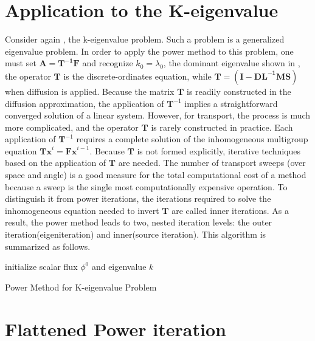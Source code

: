 \section{Application to the K-eigenvalue}

Consider again , the k-eigenvalue problem.
Such a problem is a generalized eigenvalue problem.
In order to apply the power method to this problem, one must set $\mathbf{A=T^{-1}F}$ and recognize $k_0= \lambda_0$, the dominant eigenvalue shown in , the operator $\mathbf{T}$ is the discrete-ordinates equation, while $\mathbf{T} = (\mathbf{I  - DL^{-1}MS})$ when diffusion is applied.
Because the matrix $\mathbf{T}$ is readily constructed in the diffusion approximation, the application of $\mathbf{T}^{-1}$ implies a straightforward converged solution of a linear system. 
However, for transport, the process is much more complicated, and the operator $\mathbf{T}$ is rarely constructed in practice.
Each application of $\mathbf{T}^{-1}$ requires a complete solution of the inhomogeneous multigroup equation $\mathbf{Tx}^{i} = \mathbf{Fx}^{i-1}$.
Because $\mathbf{T}$ is not formed explicitly, iterative techniques based on the application of $\mathbf{T}$ are needed. 
The number of transport sweeps (over space and angle) is a good measure for the total computational cost of a method because a sweep is the single most computationally expensive operation.
To distinguish it from power iterations, the iterations required to solve the inhomogeneous equation needed to invert $\mathbf{T}$ are called inner iterations.
As a result, the power method leads to two, nested iteration levels: the outer iteration(eigeniteration) and inner(source iteration).
This algorithm is summarized as follows.

\begin{algorithm}[H]
\SetAlgoLined
{}
 initialize scalar flux $\phi^{0}$ and eigenvalue $k$ \;
 \caption{Power Method for K-eigenvalue Problem}
\end{algorithm}

\section{Flattened Power iteration}

